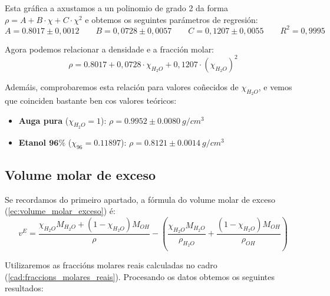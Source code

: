 \documentclass[12pt, a4paper, titlepage]{article}
\begin{document}
  Esta gráfica a axustamos a un polinomio de grado 2 da forma $\rho = A + B \cdot \chi + C \cdot \chi^2$ e obtemos os seguintes parámetros de regresión:
  \begin{equation*}
    A = 0.8017 \pm 0,0012 \qquad B = 0,0728 \pm 0,0057 \qquad C = 0,1207 \pm 0,0055 \qquad R^2 = 0,9995 
  \end{equation*}

  Agora podemos relacionar a densidade e a fracción molar:
  \begin{equation}
    \rho = 0.8017 + 0,0728 \cdot \chi_{H_2O} + 0,1207 \cdot (\chi_{H_2O})^2
    \label{ec:relacion_densidade_fraccion_molar}
  \end{equation}

  Ademáis, comprobaremos esta relación para valores coñecidos de $\chi_{H_2O}$, e vemos que coinciden bastante ben cos valores teóricos:
  \begin{itemize}
    \setlength\itemsep{-4pt}
    \item \textbf{Auga pura} ($\chi_{H_2O} = 1$): $\rho = 0.9952 \pm 0.0080 \ g/cm^3$
    \item \textbf{Etanol $\mathbf{96\%}$} ($\chi_{96} = 0.11897$): $\rho = 0.8121 \pm 0.0014 \ g/cm^3$
  \end{itemize}

  \subsection{Volume molar de exceso}
  \label{sec:v_exceso}

  Se recordamos do primeiro apartado, a fórmula do volume molar de exceso (\ref{ec:volume_molar_exceso}) é:
  \begin{equation*}
    v^E = \frac{\chi_{H_2O} M_{H_2O} + (1 - \chi_{H_2O}) M_{OH}}{\rho} - \left( \frac{\chi_{H_2O} M_{H_2O}}{\rho_{H_2O}} + \frac{(1 - \chi_{H_2O}) M_{OH}}{\rho_{OH}} \right)
  \end{equation*}

  Utilizaremos as fraccións molares reais calculadas no cadro (\ref{cad:fraccions_molares_reais}). Procesando os datos obtemos os seguintes resultados:
\end{document}
